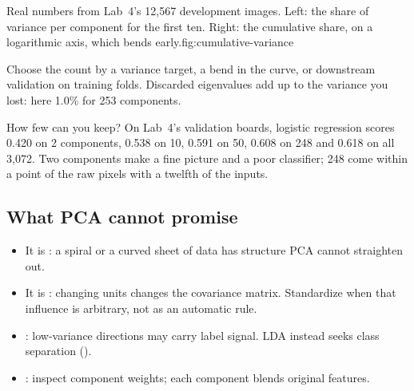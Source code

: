 \begin{utpfig}{Real numbers from Lab~4's 12,567 development images. Left: the share of variance per component for the first ten. Right: the cumulative share, on a logarithmic axis, which bends early.}{fig:cumulative-variance}
\end{utpfig}

Choose the count by a variance target, a bend in the curve, or downstream validation on training folds. Discarded eigenvalues add up to the variance you lost: here 1.0\% for 253 components.

\begin{workedexample}
How few can you keep? On Lab~4's validation boards, logistic regression scores 0.420 on 2 components, 0.538 on 10, 0.591 on 50, 0.608 on 248 and 0.618 on all 3,072. Two components make a fine picture and a poor classifier; 248 come within a point of the raw pixels with a twelfth of the inputs.
\end{workedexample}

\subsection{What PCA cannot promise}
\label{sec:pca-limitations}

\begin{itemize}
  \item It is : a spiral or a curved sheet of data has structure PCA cannot straighten out.
  \item It is : changing units changes the covariance matrix. Standardize when that influence is arbitrary, not as an automatic rule.
  \item {}: low-variance directions may carry label signal. LDA instead seeks class separation ().
  \item {}: inspect component weights; each component blends original features.
\end{itemize}

